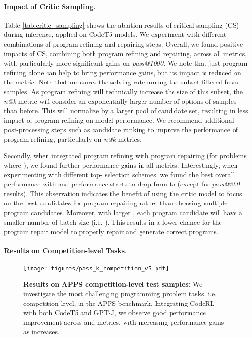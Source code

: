 \documentclass{article}
\begin{document}
\paragraph{Impact of Critic Sampling.}
Table \ref{tab:critic_sampling} shows the ablation results of critical sampling (CS) during inference, applied on CodeT5 models. 
We experiment with different combinations of program refining and repairing steps.
Overall, we found positive impacts of CS, combining both program refining and repairing, across all metrics, with particularly more significant gains on \emph{pass@1000}. 
We note that just program refining alone can help to bring performance gains, but its impact is reduced on the  metric. 
Note that  measures the solving rate among the subset  filtered from  samples. 
As program refining will technically increase the size of this subset, the \emph{n@k} metric will consider an exponentially larger number of options of  samples than before. 
This will normalize  by a larger pool of  candidate set, resulting in less impact of program refining on model performance.
We recommend additional post-processing steps such as candidate ranking \citep{cobbe2021training} to improve the performance of program refining, particularly on \emph{n@k} metrics. 

Secondly, when integrated program refining with program repairing (for problems where ), we found further performance gains in all metrics. 
Interestingly, when experimenting with different top- selection schemes, we found the best overall performance with  and performance starts to drop from  to  (except for \emph{pass@200} results). 
This observation indicates the benefit of using the critic model to focus on the best candidates for program repairing rather than choosing multiple program candidates.  
Moreover, with larger , each program candidate will have a smaller number of batch size (i.e. ).
This results in a lower chance for the program repair model to properly repair and generate correct programs. 

\paragraph{Results on Competition-level Tasks.}



\begin{figure}[t]
	\centering
	\texttt{[image: figures/pass\_k\_competition\_v5.pdf]}
\caption{
  \textbf{Results on APPS competition-level test samples:}
  We investigate the most challenging programming problem tasks, i.e. competition level, in the APPS benchmark. 
  Integrating CodeRL with both CodeT5 and GPT-J, we observe good performance improvement across  and  metrics, with increasing performance gains as  increases. 
  }
  \label{fig:pass_k_competition}
\end{figure}
\end{document}
